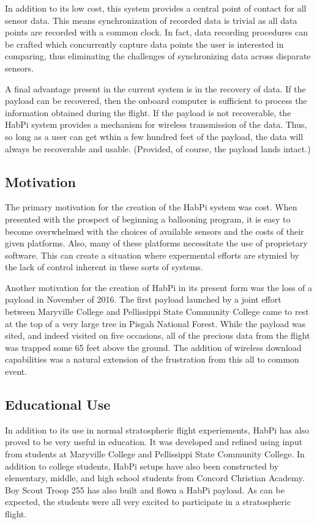 \documentclass[journal]{new-aiaa}
\begin{document}
In addition to its low cost, this system provides a central point of
contact for all sensor data.  This means synchronization of recorded
data is trivial as all data points are recorded with a common
clock.  In fact, data recording procedures can be crafted which
concurrently capture data points the user is interested in comparing,
thus eliminating the challenges of synchronizing data across disparate
sensors.

A final advantage present in the current system is in the recovery of
data.  If the payload can be recovered, then the onboard computer is
sufficient to process the information obtained during the flight.  If
the payload is not recoverable, the HabPi system provides a mechanism
for wireless transmission of the data.  Thus, so long as a user can
get wthin a few hundred feet of the payload, the data will always be
recoverable and usable. (Provided, of course, the payload lands
intact.)

\subsection{Motivation}
The primary motivation for the creation of the HabPi system was cost.
When presented with the prospect of beginning a ballooning program, it
is easy to become overwhelmed with the choices of available sensors
and the costs of their given platforms.  Also, many of these platforms
necessitate the use of proprietary software.  This can create
a situation where expermental efforts are stymied by the lack of
control inherent in these sorts of systems.

Another motivation for the creation of HabPi in its present form was
the loss of a payload in November of 2016.  The first payload launched
by a joint effort between Maryville College and Pellissippi State
Community College came to rest at the top of a very large tree in
Pisgah National Forest.  While the payload was sited, and indeed
visited on five occasions, all of the precious data from the flight
was trapped some 65 feet above the ground.  The addition of wireless
download capabilities was a natural extension of the frustration from
this all to common event.

\subsection{Educational Use}
In addition to its use in normal stratospheric flight experiements,
HabPi has also proved to be very useful in education.  It was
developed and refined using input from students at Maryville College
and Pellissippi State Community College.  In addition to college
students, HabPi setups have also been constructed by elementary,
middle, and high school students from Concord Christian Academy.  Boy
Scout Troop 255 has also built and flown a HabPi payload. As can be
expected, the students were all very excited to participate in
a stratospheric flight.
\end{document}

